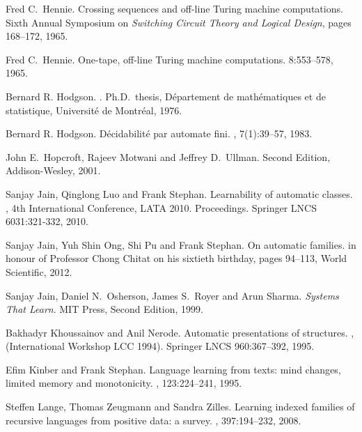 \documentclass{LMCS}
\theoremstyle{plain}\newtheorem{athm}[thm]{Theorem}
\theoremstyle{plain}\newtheorem{aprop}[thm]{Proposition}
\theoremstyle{plain}\newtheorem{aprob}[thm]{Open Problem}
\theoremstyle{plain}\newtheorem{acor}[thm]{Corollary}
\theoremstyle{plain}\newtheorem{alem}[thm]{Lemma}
\theoremstyle{definition}\newtheorem{adefn}[thm]{Definition}
\theoremstyle{definition}\newtheorem{arem}[thm]{Remark}
\theoremstyle{plain}\newtheorem{aexmp}[thm]{Example}
\theoremstyle{plain}\newtheorem{aclm}[thm]{Claim}
\begin{document}
\begin{thebibliography}{10}
 Fred C.\ Hennie.
\newblock Crossing sequences and off-line Turing machine computations.
\newblock Sixth Annual Symposium on
  {\em Switching Circuit Theory and Logical Design}, pages 168--172, 1965.

 Fred C.\ Hennie.
\newblock One-tape, off-line {Turing} machine computations.
 8:553--578, 1965.

 Bernard R. Hodgson.
.
\newblock Ph.D.\ thesis, D\'epartement de
math\'ematiques et de statistique, Universit\'e de Montr\'eal, 1976.

 Bernard R. Hodgson.
\newblock D\'ecidabilit\'e par automate fini.
,
  7(1):39--57, 1983.

 John E.\ Hopcroft, Rajeev Motwani and Jeffrey D.\ Ullman.
\newblock Second Edition, Addison-Wesley, 2001.

 Sanjay Jain, Qinglong Luo and Frank Stephan.
\newblock Learnability of automatic classes.
, 4th International
          Conference, LATA 2010.
         Proceedings.
          Springer LNCS 6031:321-332, 2010.

 Sanjay Jain, Yuh Shin Ong, Shi Pu and Frank Stephan.
\newblock On automatic families.
  in honour of Professor Chong Chitat on his sixtieth birthday,
\newblock pages 94--113, World Scientific, 2012.

 Sanjay Jain, Daniel N.\ Osherson, James S.\ Royer
and Arun Sharma.
\newblock\emph{Systems That Learn}.
\newblock MIT Press, Second Edition, 1999.

 Bakhadyr Khoussainov and Anil Nerode.
\newblock Automatic presentations of structures.
, (International
          Workshop LCC 1994). Springer LNCS 960:367--392, 1995.

 Efim Kinber and Frank Stephan.
\newblock Language learning from texts: mind changes, limited memory and
          monotonicity.
, 123:224--241, 1995.

 Steffen Lange, Thomas Zeugmann and Sandra Zilles.
\newblock Learning indexed families of recursive languages from positive
  data: a survey.
, 397:194--232, 2008.


\end{thebibliography}
\end{document}
